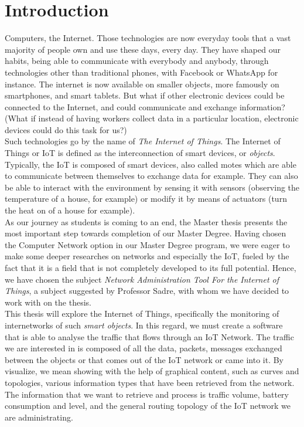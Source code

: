 \chapter*{Introduction}

Computers, the Internet. Those technologies are now everyday tools that a vast majority of people own and use these days, every day. They have shaped our habits, being able to communicate with everybody and anybody, through technologies other than traditional phones, with Facebook or WhatsApp for instance. The internet is now available on smaller objects, more famously on smartphones, and smart tablets. But what if other electronic devices could be connected to the Internet, and could communicate and exchange information? (What if instead of having workers collect data in a particular location, electronic devices could do this task for us?)\\

Such technologies go by the name of \textit{The Internet of Things}. The Internet of Things or IoT is defined as the interconnection of smart devices, or \textit{objects}. Typically, the IoT is composed of smart devices, also called motes which are able to communicate between themselves to exchange data for example. They can also be able to interact with the environment by sensing it with sensors (observing the temperature of a house, for example) or modify it by means of actuators (turn the heat on of a house for example).\\

As our journey as students is coming to an end, the Master thesis presents the most important step towards completion of our Master Degree.  Having chosen the Computer Network option in our Master Degree program, we were eager to make some deeper researches on networks and especially the IoT, fueled by the fact that it is a field that is not completely developed to its full potential. Hence, we have chosen the subject \textit{Network Administration Tool For the Internet of Things}, a subject suggested by Professor Sadre, with whom we have decided to work with on the thesis. \\

This thesis will explore the Internet of Things, specifically the monitoring of internetworks of such \textit{smart objects}.  In this regard, we must create a software that is able to analyse the traffic that flows through an IoT Network. The traffic we are interested in is composed of all the data, packets, messages exchanged between the objects or that comes out of the IoT network or came into it. By visualize, we mean showing with the help of graphical content, such as curves and topologies, various information types that have been retrieved from the network. The information that we want to retrieve and process is traffic volume, battery consumption and level, and the general routing topology of the IoT network we are administrating. \\

